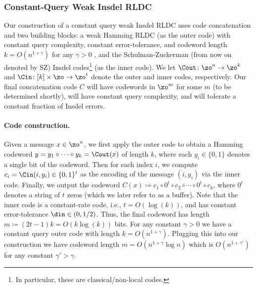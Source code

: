 \subsubsection{Constant-Query Weak Insdel RLDC}
Our construction of a constant query weak Insdel RLDC uses code concatenation and two building blocks: a weak Hamming RLDC (as the outer code) with constant query complexity, constant error-tolerance, and codeword length $k = O(n^{1+\gamma})$ for any $\gamma > 0$ \cite{Ben-SassonGHSV06}, and the Schulman-Zuckerman \cite{SchZuc99} (from now on denoted by SZ) Insdel codes\footnote{In particular, these are classical/non-local codes.} (as the inner code).
We let $\Cout \colon \zo^n \rightarrow \zo^k$ and $\Cin \colon [k] \times \zo \rightarrow \zo^t$ denote the outer and inner codes, respectively.
Our final concatenation code $C$ will have codewords in $\zo^m$ for some $m$ (to be determined shortly), will have constant query complexity, and will tolerate a constant fraction of Insdel errors.

\paragraph{Code construction.}
Given a message $x \in \zo^n$, we first apply the outer code to obtain a Hamming codeword $y = y_1 \circ \cdots \circ y_k = \Cout(x)$ of length $k$, where each $y_i \in \{0,1\}$ denotes a single bit of the codeword. 
Then for each index $i$, we compute $c_i = \Cin(i, y_i) \in \{0,1\}^t$ as the encoding of the message $(i, y_i)$ via the inner code. 
Finally, we output the codeword $C(x) \coloneqq c_1 \circ 0^t \circ c_2 \circ \cdots \circ  0^t \circ c_k$, where $0^t$ denotes a string of $t$ zeros (which we later refer to as a buffer). 
Note that the inner code is a constant-rate code, i.e., $t = O(\log(k))$, and has constant error-tolerance $\din \in (0,1/2)$.
Thus, the final codeword has length $m \coloneqq (2t-1)k = O(k \log(k))$ bits. 
For any constant $\gamma > 0$ we have a constant query outer code with length $k = O(n^{1+\gamma})$. 
Plugging this into our construction we have codeword length $ m = O( n^{1+\gamma} \log n)$ which is $O(n^{1+\gamma'})$ for any constant $\gamma' > \gamma$. %

